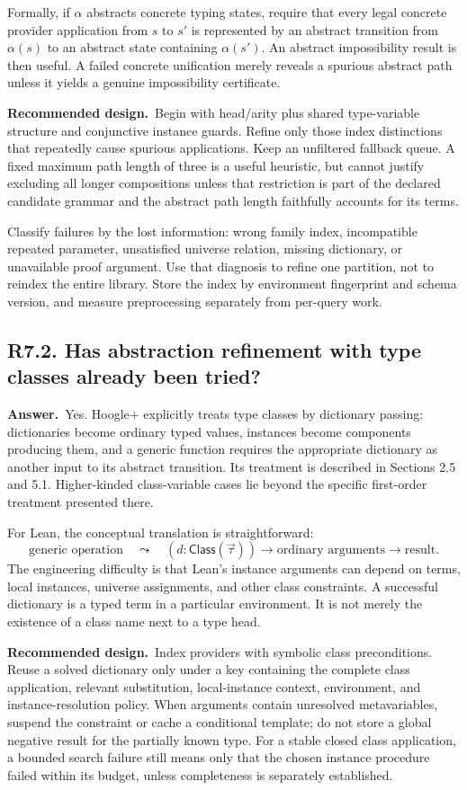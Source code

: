 \documentclass[11pt,a4paper]{article}
\newcommand{\qid}[3]{\subsection{#2. #3}\label{#1}}
\newcommand{\answer}{\noindent\textbf{Answer.}\ }
\newcommand{\proposal}{\noindent\textbf{Recommended design.}\ }
\theoremstyle{remark}
\begin{document}
Formally, if $\alpha$ abstracts concrete typing states, require that every legal concrete provider application from $s$ to $s'$ is represented by an abstract transition from $\alpha(s)$ to an abstract state containing $\alpha(s')$. An abstract impossibility result is then useful. A failed concrete unification merely reveals a spurious abstract path unless it yields a genuine impossibility certificate.

\proposal Begin with head/arity plus shared type-variable structure and conjunctive instance guards. Refine only those index distinctions that repeatedly cause spurious applications. Keep an unfiltered fallback queue. A fixed maximum path length of three is a useful heuristic, but cannot justify excluding all longer compositions unless that restriction is part of the declared candidate grammar and the abstract path length faithfully accounts for its terms.

Classify failures by the lost information: wrong family index, incompatible repeated parameter, unsatisfied universe relation, missing dictionary, or unavailable proof argument. Use that diagnosis to refine one partition, not to reindex the entire library. Store the index by environment fingerprint and schema version, and measure preprocessing separately from per-query work.

\qid{q72}{R7.2}{Has abstraction refinement with type classes already been tried?}
\answer Yes. Hoogle+ explicitly treats type classes by dictionary passing: dictionaries become ordinary typed values, instances become components producing them, and a generic function requires the appropriate dictionary as another input to its abstract transition. Its treatment is described in Sections 2.5 and 5.1. Higher-kinded class-variable cases lie beyond the specific first-order treatment presented there.~\cite{hoogle}

For Lean, the conceptual translation is straightforward:
\[
 \text{generic operation}
 \quad\leadsto\quad
 (d:\mathsf{Class}(\vec\tau))\to\text{ordinary arguments}\to\text{result}.
\]
The engineering difficulty is that Lean's instance arguments can depend on terms, local instances, universe assignments, and other class constraints. A successful dictionary is a typed term in a particular environment. It is not merely the existence of a class name next to a type head.

\proposal Index providers with symbolic class preconditions. Reuse a solved dictionary only under a key containing the complete class application, relevant substitution, local-instance context, environment, and instance-resolution policy. When arguments contain unresolved metavariables, suspend the constraint or cache a conditional template; do not store a global negative result for the partially known type. For a stable closed class application, a bounded search failure still means only that the chosen instance procedure failed within its budget, unless completeness is separately established.
\end{document}

